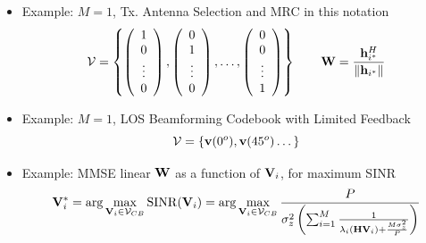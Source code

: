 \documentclass[xcolor=dvipsnames,aspectratio=169]{beamer}
\begin{document}
{ 
 \begin{itemize}
  \item Example: $M=1$, Tx. Antenna Selection and MRC in this notation
  $$\mathcal{V}=\left\{\left(\begin{array}{c}1\\0\\\vdots\\0\end{array}\right),\left(\begin{array}{c}0\\1\\\vdots\\0\end{array}\right),\dots,\left(\begin{array}{c}0\\0\\\vdots\\1\end{array}\right)\right\}\qquad \mathbf{W}=\frac{\mathbf{h}_{i^*}^H}{\|\mathbf{h}_{i^*}\|}$$
  
  \item Example: $M=1$, LOS Beamforming Codebook with Limited Feedback
       $$\mathcal{V}=\left\{\mathbf{v}(0^o),\mathbf{v}(45^o)\dots\right\}$$
  \item Example: MMSE linear $\mathbf{W}$ as a function of $\mathbf{V}_i$, for maximum SINR
  $$\mathbf{V}_i^*=\arg \max_{\mathbf{V}_i\in\mathcal{V}_{CB}} \mathrm{SINR}(\mathbf{V}_i)=\arg \max_{\mathbf{V}_i\in\mathcal{V}_{CB}}\frac{P}{\sigma_z^2\left(\sum_{i=1}^{M}\frac{1}{\lambda_i(\mathbf{H}\mathbf{V}_i)+\frac{M\sigma_z^2}{P}}\right)}$$  
  \end{itemize}
}
\end{document}
